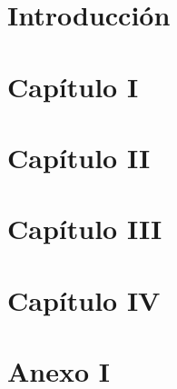 \documentclass[a4paper,12pt,titlepage]{article}
\begin{document}
\thispagestyle{empty} %
\newpage

\newpage

\setcounter{secnumdepth}{4}
\setcounter{tocdepth}{4}
\setcounter{page}{1} 

\newpage
\tableofcontents
\newpage
\listoffigures
\newpage
\listoftables
\newpage

\setcounter{secnumdepth}{0}
\section{Introducción}

\newpage
\section{Capítulo I}

\newpage
\section{Capítulo II}

\newpage
\section{Capítulo III}

\newpage
\section{Capítulo IV}

\newpage

\appendix
\newpage
\section{Anexo I}

\newpage


\newpage
\end{document}
